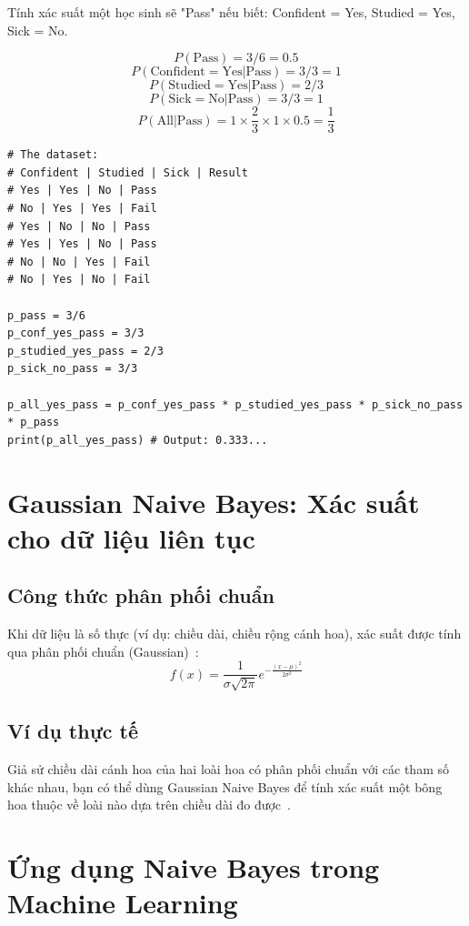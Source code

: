 Tính xác suất một học sinh sẽ "Pass" nếu biết: Confident = Yes, Studied = Yes, Sick = No.

\[
P(\text{Pass}) = 3/6 = 0.5
\]
\[
P(\text{Confident} = \text{Yes} | \text{Pass}) = 3/3 = 1
\]
\[
P(\text{Studied} = \text{Yes} | \text{Pass}) = 2/3
\]
\[
P(\text{Sick} = \text{No} | \text{Pass}) = 3/3 = 1
\]
\[
P(\text{All}|\text{Pass}) = 1 \times \frac{2}{3} \times 1 \times 0.5 = \frac{1}{3}
\]

\begin{lstlisting}[caption={Probability calculation using Python}]
# The dataset:
# Confident | Studied | Sick | Result
# Yes | Yes | No | Pass
# No | Yes | Yes | Fail
# Yes | No | No | Pass
# Yes | Yes | No | Pass
# No | No | Yes | Fail
# No | Yes | No | Fail

p_pass = 3/6
p_conf_yes_pass = 3/3
p_studied_yes_pass = 2/3
p_sick_no_pass = 3/3

p_all_yes_pass = p_conf_yes_pass * p_studied_yes_pass * p_sick_no_pass * p_pass
print(p_all_yes_pass) # Output: 0.333...
\end{lstlisting}

\section{Gaussian Naive Bayes: Xác suất cho dữ liệu liên tục}

\subsection{Công thức phân phối chuẩn}

Khi dữ liệu là số thực (ví dụ: chiều dài, chiều rộng cánh hoa), xác suất được tính qua phân phối chuẩn (Gaussian)~\cite{bishop2006pattern}:
\[
f(x) = \frac{1}{\sigma \sqrt{2\pi}} e^{-\frac{(x-\mu)^2}{2\sigma^2}}
\]

\subsection{Ví dụ thực tế}

Giả sử chiều dài cánh hoa của hai loài hoa có phân phối chuẩn với các tham số khác nhau, bạn có thể dùng Gaussian Naive Bayes để tính xác suất một bông hoa thuộc về loài nào dựa trên chiều dài đo được~\cite{bishop2006pattern}.

\section{Ứng dụng Naive Bayes trong Machine Learning}

